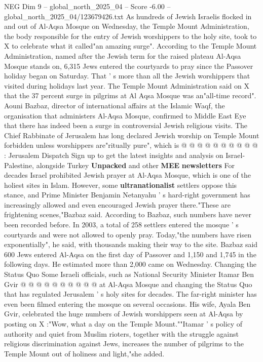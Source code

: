 \begin{textsample}{NEG Dim 9 – global\_north\_2025\_04 – Score -6.00 – global\_north\_2025\_04/123679426.txt}  \label{ex:f9_neg_032}
As hundreds of Jewish Israelis flocked in and out of Al-Aqsa Mosque on Wednesday, the Temple Mount Administration, the body responsible for the entry of Jewish worshippers to the holy site, took to X to celebrate what it called"an amazing surge".
According to the Temple Mount Administration, named after the Jewish term for the raised plateau Al-Aqsa Mosque stands on, 6,315 Jews entered the courtyards to pray since the Passover holiday began on Saturday.
That ' s more than all the Jewish worshippers that visited during holidays last year.
The Temple Mount Administration said on X that the 37 percent surge in pilgrims at Al Aqsa Mosque was an"all-time record".
Aouni Bazbaz, director of international affairs at the Islamic Waqf, the organisation that administers Al-Aqsa Mosque, confirmed to Middle East Eye that there has indeed been a surge in controversial Jewish religious visits.
The Chief Rabbinate of Jerusalem has long declared Jewish worship on Temple Mount forbidden unless worshippers are"ritually pure", which is @ @ @ @ @ @ @ @ @ @ : Jerusalem Dispatch Sign up to get the latest insights and analysis on Israel-Palestine, alongside Turkey \textbf{Unpacked} and other \textbf{MEE} \textbf{newsletters} For decades Israel prohibited Jewish prayer at Al-Aqsa Mosque, which is one of the holiest sites in Islam.
However, some \textbf{ultranationalist} settlers oppose this stance, and Prime Minister Benjamin Netanyahu ' s hard-right government has increasingly allowed and even encouraged Jewish prayer there."These are frightening scenes,"Bazbaz said.
According to Bazbaz, such numbers have never been recorded before.
In 2003, a total of 258 settlers entered the mosque ' s courtyards and were not allowed to openly pray.
Today,"the numbers have risen exponentially", he said, with thousands making their way to the site.
Bazbaz said 600 Jews entered Al-Aqsa on the first day of Passover and 1,150 and 1,745 in the following days.
He estimated more than 2,000 came on Wednesday.
Changing the Status Quo Some Israeli officials, such as National Security Minister Itamar Ben Gvir @ @ @ @ @ @ @ @ @ @ at Al-Aqsa Mosque and changing the Status Quo that has regulated Jerusalem ' s holy sites for decades.
The far-right minister has even been filmed entering the mosque on several occasions.
His wife, Ayala Ben Gvir, celebrated the huge numbers of Jewish worshippers seen at Al-Aqsa by posting on X :"Wow, what a day on the Temple Mount.""Itamar ' s policy of authority and quiet from Muslim rioters, together with the struggle against religious discrimination against Jews, increases the number of pilgrims to the Temple Mount out of holiness and light,"she added.

\end{textsample}
